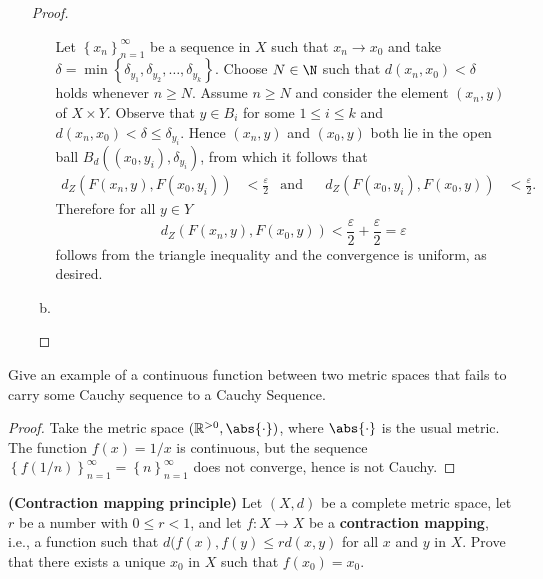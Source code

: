 \documentclass[12pt]{amsart}
\begin{document}
\begin{setup}
\begin{enumerate}[(a)]
\begin{proof}
\begin{enumerate}[(a)]
          Let $\left\{x_n\right\}_{n=1}^{\infty}$ be a sequence in $X$ such that $x_n \rightarrow x_0$ and take $\delta = \min \left\{\delta_{y_1}, \delta_{y_2}, \ldots, \delta_{y_k}\right\}$.
          Choose $N \in \N$ such that $d(x_n, x_0) < \delta$ holds whenever $n \geq N$.
          Assume $n \geq N$ and consider the element $(x_n, y)$ of  $X \times Y$.
          Observe that $y \in B_i$ for some $1 \leq i \leq k$ and $d(x_n, x_0) < \delta \leq \delta_{y_i}$.
          Hence $(x_n, y)$ and $(x_0, y)$ both lie in the open ball $B_d\left(\left(x_0, y_i\right), \delta_{y_i}\right)$, from which it follows that          
          \begin{align*}
            d_Z\left(F\left(x_n, y\right), F\left(x_0, y_i\right)\right) &< \frac{\varepsilon}{2} & \text{and}&& d_Z\left(F\left(x_0, y_i\right), F\left(x_0, y\right)\right) &< \frac{\varepsilon}{2}.
          \end{align*}
          Therefore for all $y \in Y$
          $$d_Z(F(x_n, y), F(x_0, y)) < \frac{\varepsilon}{2} + \frac{\varepsilon}{2} = \varepsilon$$
          follows from the triangle inequality and the convergence is uniform, as desired.
        \item
      \end{enumerate}
    \end{proof}
  \end{enumerate}
\end{setup}

\begin{setup}
  Give an example of a continuous function between two metric spaces that fails to carry some Cauchy sequence to a Cauchy Sequence.
  \begin{proof}
    Take the metric space $(\mathbb{R}^{>0}, \abs{\cdot})$, where $\abs{\cdot}$ is the usual metric.
    The function $f(x) = 1/x$ is continuous, but the sequence $\left\{f(1/n)\right\}_{n=1}^\infty = \left\{n\right\}_{n=1}^\infty$ does not converge, hence is not Cauchy.
  \end{proof}
\end{setup}

\begin{setup}
  {\bf (Contraction mapping principle)} Let $(X,d)$ be a complete metric space, let $r$ be a number with $0 \leq r < 1$, and let $f \colon X \rightarrow X$ be a {\bf contraction mapping}, i.e., a function such that $d(f(x), f(y) \leq rd(x,y)$ for all $x$ and $y$ in $X$.
  Prove that there exists a unique $x_0$ in $X$ such that $f(x_0) = x_0$.
\end{setup}
\end{document}
